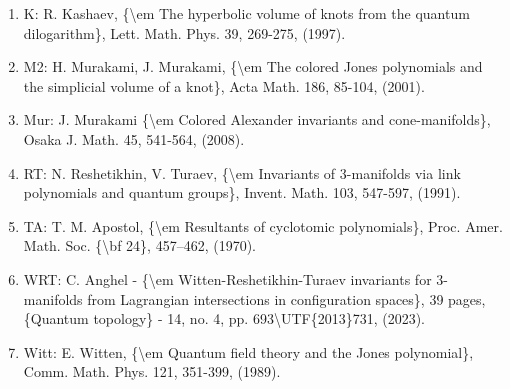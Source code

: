 \documentclass[11pt]{article}
\begin{document}
\begin{enumerate}[leftmargin=*]
  \item K: R. Kashaev, \{\textbackslash{}em The hyperbolic volume of knots from the quantum dilogarithm\}, Lett. Math. Phys. 39, 269-275, (1997).
  \item M2: H. Murakami, J. Murakami, \{\textbackslash{}em The colored Jones polynomials and the simplicial volume of a knot\}, Acta Math. 186, 85-104, (2001).
  \item Mur: J. Murakami \{\textbackslash{}em Colored Alexander invariants and cone-manifolds\}, Osaka J. Math. 45, 541-564, (2008).
  \item RT: N. Reshetikhin, V. Turaev, \{\textbackslash{}em Invariants of 3-manifolds via link polynomials and quantum groups\}, Invent. Math. 103, 547-597, (1991).
  \item TA: T. M. Apostol, \{\textbackslash{}em Resultants of cyclotomic polynomials\}, Proc. Amer. Math. Soc. \{\textbackslash{}bf 24\}, 457--462, (1970).
  \item WRT: C. Anghel - \{\textbackslash{}em Witten-Reshetikhin-Turaev invariants for 3-manifolds from Lagrangian intersections in configuration spaces\}, 39 pages, \{Quantum topology\} - 14, no. 4, pp. 693\textbackslash{}UTF\{2013\}731, (2023).
  \item Witt: E. Witten, \{\textbackslash{}em Quantum field theory and the Jones polynomial\}, Comm. Math. Phys. 121, 351-399, (1989).
\end{enumerate}

% 
% 
\end{document}
